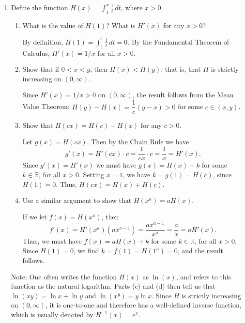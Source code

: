 \documentclass[letterpaper,12pt]{article}
\newcommand{\R}{\mathbb{R}}
\begin{document}
\begin{enumerate}
\bigskip

\newpage
 \item Define the function $\displaystyle H(x) = \int_1^x\frac{1}{t}\,dt$, where $x>0$.
\begin{enumerate}
 \item What is the value of $H(1)$? What is $H'(x)$ for any $x>0$?

\bigskip

By definition, $H(1) = \int_1^1 \frac{1}{t}\,dt = 0$. By the Fundamental Theorem of Calculus, $H'(x) = 1/x$ for all $x>0$.

\bigskip

 \item Show that if $0<x<y$, then $H(x)<H(y)$; that is, that $H$ is strictly increasing on $(0,\infty)$.

\bigskip

Since $H'(x)=1/x>0$ on $(0,\infty)$, the result follows from the Mean Value Theorem: $H(y)-H(x) = \dfrac{1}{c}(y-x)>0$ for some $c\in (x,y)$.

\bigskip

 \item Show that $H(cx)=H(c)+H(x)$ for any $c>0$.

\bigskip

Let $g(x)=H(cx)$. Then by the Chain Rule we have
\[
 g'(x) = H'(cx)\cdot c = \frac{1}{cx}\cdot c = \frac{1}{x} = H'(x).
\]
Since $g'(x)=H'(x)$ we must have $g(x)=H(x)+k$ for some $k\in \R$, for all $x>0$. Setting $x=1$, we have $k=g(1)= H(c)$, since $H(1)=0$. Thus, $H(cx)=H(x)+H(c)$.

\bigskip

 \item Use a similar argument to show that $H(x^a)=aH(x)$.

\bigskip

If we let $f(x) = H(x^a)$, then
\[
 f'(x) = H'(x^a)(ax^{a-1}) = \frac{ax^{a-1}}{x^a} = \frac{a}{x} = aH'(x).
\]
Thus, we must have $f(x)=aH(x)+k$ for some $k\in\R$, for all $x>0$. Since $H(1)=0$, we find $k=f(1) = H(1^a) = 0$, and the result follows.

\bigskip

\end{enumerate}
Note: One often writes the function $H(x)$ as $\ln(x)$, and refers to this function as the natural logarithm. Parts (c) and (d) then tell us that $\ln(xy)=\ln x+\ln y$ and $\ln(x^y)=y\ln x$. Since $H$ is strictly increasing on $(0,\infty)$, it is one-to-one and therefore has a well-defined inverse function, which is usually denoted by $H^{-1}(x)=e^x$.


\end{enumerate}
\end{document}
